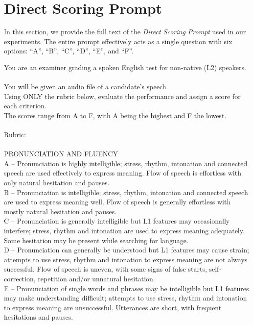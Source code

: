 \documentclass{report}
\begin{document}
\section{Direct Scoring Prompt}
\label{app_sec:direct_scoring_prompt}
In this section, we provide the full text of the \emph{Direct Scoring Prompt} used in our experiments. The entire prompt effectively acts as a single question with six options: ``A'', ``B'', ``C'', ``D'', ``E'', and ``F''.

\begingroup
\small
\begin{tcolorbox}[breakable, colback=white, colframe=black, title=Direct Scoring Prompt]
You are an examiner grading a spoken English test for non-native (L2) speakers.
\\\\
You will be given an audio file of a candidate's speech.\\Using ONLY the rubric below, evaluate the performance and assign a score for each criterion.
\\The scores range from A to F, with A being the highest and F the lowest.
\\\\
Rubric:
\\\\
PRONUNCIATION AND FLUENCY
\\A -- Pronunciation is highly intelligible; stress, rhythm, intonation and connected speech are used effectively to express meaning. Flow of speech is effortless with only natural hesitation and pauses.
\\B -- Pronunciation is intelligible; stress, rhythm, intonation and connected speech are used to express meaning well. Flow of speech is generally effortless with mostly natural hesitation and pauses.
\\C -- Pronunciation is generally intelligible but L1 features may occasionally interfere; stress, rhythm and intonation are used to express meaning adequately. Some hesitation may be present while searching for language.
\\D -- Pronunciation can generally be understood but L1 features may cause strain; attempts to use stress, rhythm and intonation to express meaning are not always successful. Flow of speech is uneven, with some signs of false starts, self-correction, repetition and/or unnatural hesitation.
\\E -- Pronunciation of single words and phrases may be intelligible but L1 features may make understanding difficult; attempts to use stress, rhythm and intonation to express meaning are unsuccessful. Utterances are short, with frequent hesitations and pauses.

\end{tcolorbox}
\end{document}
